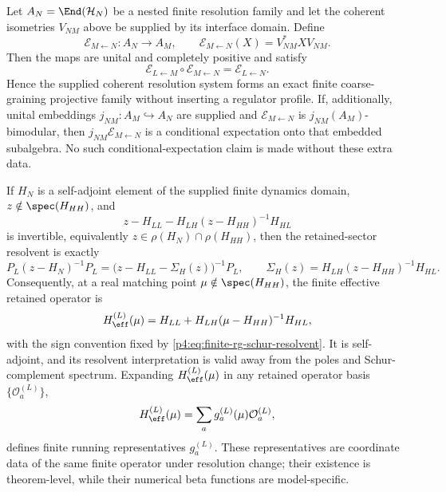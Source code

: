 \documentclass[12pt,a4paper]{article}
\begin{document}
\begin{theorem}
\label{p4:thm:finite-resolution-rg-threshold-matching}
Let \(A_N=\End(\mathcal H_N)\) be a nested finite resolution family and let
the coherent isometries \(V_{NM}\) above be supplied by its interface domain.
Define
\[
\mathcal E_{M\leftarrow N}:A_N\longrightarrow A_M,
\qquad
\mathcal E_{M\leftarrow N}(X)=V_{NM}^*XV_{NM}.
\]
Then the maps are unital and completely positive and satisfy
\[
\mathcal E_{L\leftarrow M}\circ \mathcal E_{M\leftarrow N}=\mathcal E_{L\leftarrow N}.
\]
Hence the supplied coherent resolution system forms an exact finite
coarse-graining projective family without inserting a regulator profile.
If, additionally, unital embeddings \(j_{NM}:A_M\hookrightarrow A_N\) are
supplied and \(\mathcal E_{M\leftarrow N}\) is
\(j_{NM}(A_M)\)-bimodular, then \(j_{NM}\mathcal E_{M\leftarrow N}\) is a
conditional expectation onto that embedded subalgebra.  No such
conditional-expectation claim is made without these extra data.

If \(H_N\) is a self-adjoint element of the supplied finite dynamics domain,
\(z\notin\spec(H_{HH})\), and
\[
z-H_{LL}-H_{LH}(z-H_{HH})^{-1}H_{HL}
\]
is invertible, equivalently \(z\in\rho(H_N)\cap\rho(H_{HH})\), then the retained-sector resolvent is exactly
\begin{equation}
\label{p4:eq:finite-rg-schur-resolvent}
P_L(z-H_N)^{-1}P_L
=
\bigl(z-H_{LL}-\Sigma_H(z)\bigr)^{-1}P_L,
\qquad
\Sigma_H(z)=H_{LH}(z-H_{HH})^{-1}H_{HL}.
\end{equation}
Consequently, at a real matching point \(\mu\notin\spec(H_{HH})\), the finite effective retained operator is
\begin{equation}
\label{p4:eq:finite-rg-effective-hamiltonian}
H_{\eff}^{(L)}(\mu)
=
H_{LL}+H_{LH}(\mu-H_{HH})^{-1}H_{HL},
\end{equation}
with the sign convention fixed by \eqref{p4:eq:finite-rg-schur-resolvent}.  It is self-adjoint, and its resolvent interpretation is valid away from the poles and Schur-complement spectrum.  Expanding \(H_{\eff}^{(L)}(\mu)\) in any retained operator basis \(\{\mathcal O_a^{(L)}\}\),
\begin{equation}
\label{p4:eq:finite-rg-running-coordinates}
H_{\eff}^{(L)}(\mu)=\sum_a g_a^{(L)}(\mu)\mathcal O_a^{(L)},
\end{equation}
defines finite running representatives \(g_a^{(L)}\).  These representatives are coordinate data of the same finite operator under resolution change; their existence is theorem-level, while their numerical beta functions are model-specific.
\end{theorem}
\end{document}
